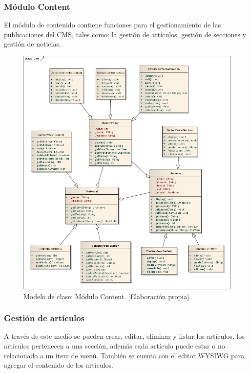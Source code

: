 \subsubsection{M\'odulo Content}
El m\'odulo de contenido contiene funciones para el gestionamiento de las publicaciones del CMS, tales como: la gesti\'on de art\'iculos, gesti\'on de secciones y gesti\'on de noticias.

\begin{figure}[h]
\centering
\includegraphics[scale=.4, keepaspectratio=true]{imagenes/14_imagen.png}
\caption{Modelo de clase: M\'odulo Content. [Elaboraci\'on propia].}
\end{figure}

\subsubsection{Gesti\'on de art\'iculos}
A trav\'es de este medio se pueden crear, editar, eliminar y listar los art\'iculos, los art\'iculos pertenecen a una secci\'on, adem\'as cada art\'iculo puede estar o no relacionado a un item de men\'u. Tambi\'en se cuenta con el editor WYSIWG para agregar el contenido de los art\'iculos.

